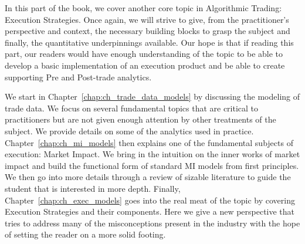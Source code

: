 
In this part of the book, we cover another core topic in Algorithmic Trading: Execution Strategies. Once again, we will strive to give, from the practitioner's perspective and context, the necessary building blocks to grasp the subject and finally, the quantitative underpinnings available. Our hope is that if reading this part, our readers would have enough understanding of the topic to be able to develop a basic implementation of an execution product and be able to create supporting Pre and Post-trade analytics.


We start in Chapter~\ref{chap:ch_trade_data_models} by discussing the modeling of trade data. We focus on several fundamental topics that are critical to practitioners but are not given enough attention by other treatments of the subject. We provide details on some of the analytics used in practice. Chapter~\ref{chap:ch_mi_models} then explains one of the fundamental subjects of execution: Market Impact. We bring in the intuition on the inner works of market impact and build the functional form of standard MI models from first principles. We then go into more details through a review of  sizable literature to guide the student that is interested in more depth. Finally, Chapter~\ref{chap:ch_exec_models} goes into the real meat of the topic by covering Execution Strategies and their components. Here we give a new perspective that tries to address many of the misconceptions present in the industry with the hope of setting the reader on a more solid footing.